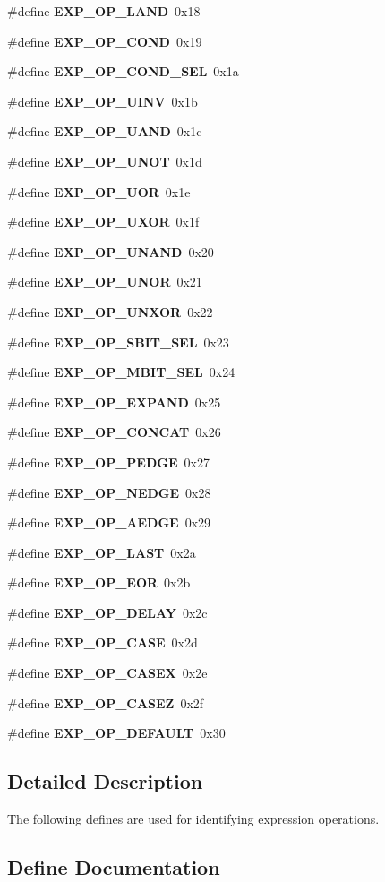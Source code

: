 \begin{CompactItemize}
\#define {\bf EXP\_\-OP\_\-LAND}\ 0x18
\item 
\#define {\bf EXP\_\-OP\_\-COND}\ 0x19
\item 
\#define {\bf EXP\_\-OP\_\-COND\_\-SEL}\ 0x1a
\item 
\#define {\bf EXP\_\-OP\_\-UINV}\ 0x1b
\item 
\#define {\bf EXP\_\-OP\_\-UAND}\ 0x1c
\item 
\#define {\bf EXP\_\-OP\_\-UNOT}\ 0x1d
\item 
\#define {\bf EXP\_\-OP\_\-UOR}\ 0x1e
\item 
\#define {\bf EXP\_\-OP\_\-UXOR}\ 0x1f
\item 
\#define {\bf EXP\_\-OP\_\-UNAND}\ 0x20
\item 
\#define {\bf EXP\_\-OP\_\-UNOR}\ 0x21
\item 
\#define {\bf EXP\_\-OP\_\-UNXOR}\ 0x22
\item 
\#define {\bf EXP\_\-OP\_\-SBIT\_\-SEL}\ 0x23
\item 
\#define {\bf EXP\_\-OP\_\-MBIT\_\-SEL}\ 0x24
\item 
\#define {\bf EXP\_\-OP\_\-EXPAND}\ 0x25
\item 
\#define {\bf EXP\_\-OP\_\-CONCAT}\ 0x26
\item 
\#define {\bf EXP\_\-OP\_\-PEDGE}\ 0x27
\item 
\#define {\bf EXP\_\-OP\_\-NEDGE}\ 0x28
\item 
\#define {\bf EXP\_\-OP\_\-AEDGE}\ 0x29
\item 
\#define {\bf EXP\_\-OP\_\-LAST}\ 0x2a
\item 
\#define {\bf EXP\_\-OP\_\-EOR}\ 0x2b
\item 
\#define {\bf EXP\_\-OP\_\-DELAY}\ 0x2c
\item 
\#define {\bf EXP\_\-OP\_\-CASE}\ 0x2d
\item 
\#define {\bf EXP\_\-OP\_\-CASEX}\ 0x2e
\item 
\#define {\bf EXP\_\-OP\_\-CASEZ}\ 0x2f
\item 
\#define {\bf EXP\_\-OP\_\-DEFAULT}\ 0x30
\end{CompactItemize}


\subsection{Detailed Description}
The following defines are used for identifying expression operations. 

\subsection{Define Documentation}
